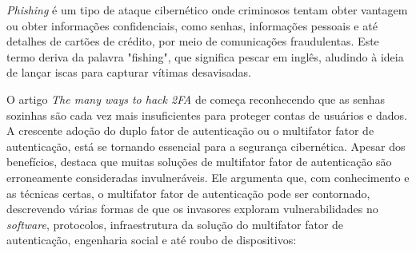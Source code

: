 \documentclass[12pt]{article}
\begin{document}
\textit{Phishing} é um tipo de ataque cibernético onde criminosos tentam obter
vantagem ou obter informações confidenciais, como senhas, informações
pessoais e até detalhes de cartões de crédito, por meio de comunicações
fraudulentas.
Este termo deriva da palavra "fishing", que significa pescar em inglês,
aludindo à ideia de lançar iscas para capturar vítimas desavisadas.

O artigo \textit{The many ways to hack 2FA} de \cite{article:3} começa reconhecendo que as senhas
sozinhas são cada vez mais insuficientes para proteger contas de usuários e dados.
A crescente adoção do duplo fator de autenticação ou o multifator fator de autenticação, está
se tornando essencial para a segurança cibernética.
Apesar dos benefícios, \cite{article:3} destaca que muitas soluções de multifator fator de
autenticação são erroneamente consideradas invulneráveis.
Ele argumenta que, com conhecimento e as técnicas certas, o multifator fator de autenticação
pode ser contornado, descrevendo várias formas de que os invasores exploram vulnerabilidades no
\textit{software}, protocolos, infraestrutura da solução do multifator fator de autenticação,
engenharia social e até roubo de dispositivos:
\end{document}

